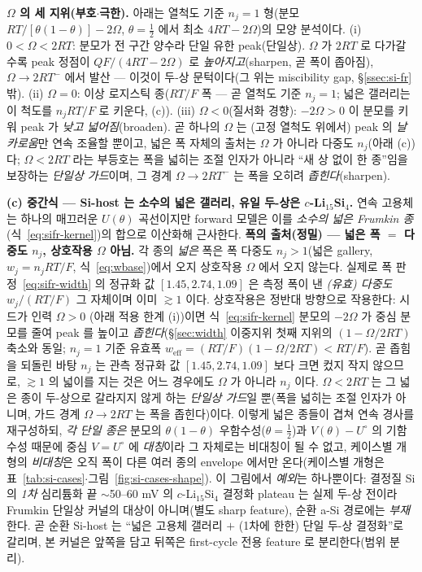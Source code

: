 \begin{signbox}
\textbf{$\Omega$ 의 세 지위(부호$\cdot$극한).} 아래는 열척도 기준 $n_j{=}1$ 형(분모 $RT/[\theta(1-\theta)]-2\Omega$,
$\theta{=}\tfrac12$ 에서 최소 $4RT-2\Omega$)의 모양 분석이다. (i) $0<\Omega<2RT$: 분모가 전 구간 양수라 단일 유한
peak(단일상). $\Omega$ 가 $2RT$ 로 다가갈수록 peak 정점이 $Q F/(4RT-2\Omega)$ 로 \emph{높아지고}(sharpen, 곧 폭이
좁아짐), $\Omega{\to}2RT^-$ 에서 발산 --- 이것이 두-상 문턱이다(그 위는 miscibility gap, \S\ref{ssec:si-fr} 밖). (ii)
$\Omega{=}0$: 이상 로지스틱 종($RT/F$ 폭 --- 곧 열척도 기준 $n_j{=}1$; 넓은 갤러리는 이 척도를 $n_jRT/F$ 로 키운다,
(c)). (iii) $\Omega<0$(질서화 경향): $-2\Omega>0$ 이 분모를 키워 peak 가 \emph{낮고 넓어짐}(broaden). 곧 하나의 $\Omega$
는 (고정 열척도 위에서) peak 의 \emph{날카로움}만 연속 조율할 뿐이고, 넓은 폭 자체의 출처는 $\Omega$ 가 아니라
다중도 $n_j$(아래 (c))다; $\Omega<2RT$ 라는 부등호는 폭을 넓히는 조절 인자가 아니라 ``새 상 없이 한 종''임을 보장하는
\emph{단일상 가드}이며, 그 경계 $\Omega{\to}2RT^-$ 는 폭을 오히려 \emph{좁힌다}(sharpen).
\end{signbox}

\textbf{(c) 중간식 --- Si-host 는 소수의 넓은 갤러리, 유일 두-상은 $c$-Li$_{15}$Si$_4$.} 연속 고용체는 하나의
매끄러운 $U(\theta)$ 곡선이지만 forward 모델은 이를 \emph{소수의 넓은 Frumkin 종}(식~\eqref{eq:sifr-kernel})의
합으로 이산화해 근사한다. \textbf{폭의 출처(정밀) --- 넓은 폭 $=$ 다중도 $n_j$, 상호작용 $\Omega$ 아님.} 각 종의
\emph{넓은} 폭은 폭 다중도 $n_j{>}1$(넓은 gallery, $w_j{=}n_jRT/F$, 식~\eqref{eq:wbase})에서 오지 상호작용 $\Omega$
에서 오지 않는다. 실제로 폭 판정~\eqref{eq:sifr-width} 의 정규화 값 $[1.45,2.74,1.09]$ 은 측정 폭이 낸 \emph{(유효)
다중도} $w_j/(RT/F)$ 그 자체이며 이미 $\gtrsim1$ 이다. 상호작용은 정반대 방향으로 작용한다: 시드가 인력 $\Omega{>}0$
(아래 적용 한계 (i))이면 식~\eqref{eq:sifr-kernel} 분모의 $-2\Omega$ 가 중심 분모를 줄여 peak 를 높이고
\emph{좁힌다}(\S\ref{sec:width} 이중지위 첫째 지위의 $(1-\Omega/2RT)$ 축소와 동일; $n_j{=}1$ 기준 유효폭
$w_\mathrm{eff}{=}(RT/F)(1-\Omega/2RT)<RT/F$). 곧 좁힘을 되돌린 바탕 $n_j$ 는 관측 정규화 값 $[1.45,2.74,1.09]$ 보다
크면 컸지 작지 않으므로, $\gtrsim1$ 의 넓이를 지는 것은 어느 경우에도 $\Omega$ 가 아니라 $n_j$ 이다. $\Omega<2RT$ 는
그 넓은 종이 두-상으로 갈라지지 않게 하는 \emph{단일상 가드}일 뿐(폭을 넓히는 조절 인자가 아니며, 가드 경계
$\Omega{\to}2RT$ 는 폭을 좁힌다)이다. 이렇게 넓은 종들이 겹쳐 연속 경사를 재구성하되, \emph{각 단일 종은} 분모의
$\theta(1-\theta)$ 우함수성($\theta{=}\tfrac12$)과 $V(\theta){-}U^\circ$ 의 기함수성 때문에 중심 $V{=}U^\circ$ 에
\emph{대칭}이라 그 자체로는 비대칭이 될 수 없고, 케이스별 개형의 \emph{비대칭}은 오직 폭이 다른 여러 종의 envelope
에서만 온다(케이스별 개형은 표~\ref{tab:si-cases}$\cdot$그림~\ref{fig:si-cases-shape}). 이 그림에서 \emph{예외}는
하나뿐이다: 결정질 Si 의 \emph{1차} 심리튬화 끝 $\sim$50--60 mV 의 $c$-Li$_{15}$Si$_4$ 결정화 plateau 는 실제 두-상
전이라\cite{obrovac_christensen2004,ogata_nmr2014} Frumkin 단일상 커널의 대상이 아니며(별도 sharp feature), 순환
a-Si 경로에는 \emph{부재}한다\cite{chevrier_dahn2009}. 곧 순환 Si-host 는 ``넓은 고용체 갤러리 $+$ (1차에 한한)
단일 두-상 결정화''로 갈리며, 본 커널은 앞쪽을 담고 뒤쪽은 first-cycle 전용 feature 로 분리한다(범위 분리).

